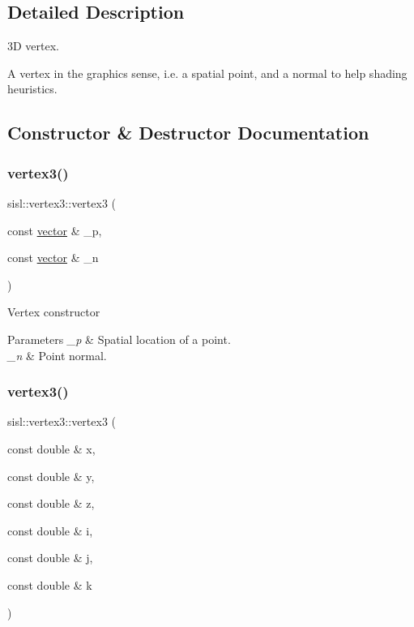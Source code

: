 \subsection{Detailed Description}
3D vertex. 

A vertex in the graphics sense, i.\+e. a spatial point, and a normal to help shading heuristics. 

\subsection{Constructor \& Destructor Documentation}
\mbox{\label{structsisl_1_1vertex3_ab40c72beb889e4cca21d372eff7886ef}} 
\subsubsection{\texorpdfstring{vertex3()}{vertex3()}\hspace{0.1cm}{\footnotesize\ttfamily [1/3]}}
{\footnotesize\ttfamily sisl\+::vertex3\+::vertex3 (\begin{DoxyParamCaption}\item[{const \hyperlink{namespacesisl_a2069bd5374a9be042ff3ce3306d41e1a}{vector} \&}]{\+\_\+p,  }\item[{const \hyperlink{namespacesisl_a2069bd5374a9be042ff3ce3306d41e1a}{vector} \&}]{\+\_\+n }\end{DoxyParamCaption})\hspace{0.3cm}{\ttfamily [inline]}}

Vertex constructor 
\begin{DoxyParams}{Parameters}
{\em \+\_\+p} & Spatial location of a point. \\
\hline
{\em \+\_\+n} & Point normal. \\
\hline
\end{DoxyParams}
\mbox{\label{structsisl_1_1vertex3_a9ced36fc7fbadbb1a9fd285529417f28}} 
\subsubsection{\texorpdfstring{vertex3()}{vertex3()}\hspace{0.1cm}{\footnotesize\ttfamily [2/3]}}
{\footnotesize\ttfamily sisl\+::vertex3\+::vertex3 (\begin{DoxyParamCaption}\item[{const double \&}]{x,  }\item[{const double \&}]{y,  }\item[{const double \&}]{z,  }\item[{const double \&}]{i,  }\item[{const double \&}]{j,  }\item[{const double \&}]{k }\end{DoxyParamCaption})\hspace{0.3cm}{\ttfamily [inline]}}

